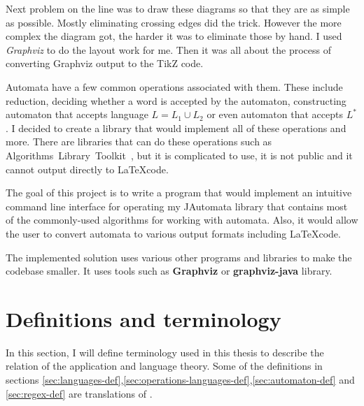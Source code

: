 \documentclass{ctuthesis}
\begin{document}
Next problem on the line was to draw these diagrams so that they are as simple as possible. Mostly eliminating crossing edges did the trick. However the more complex the diagram got, the harder it was to eliminate those by hand. I used \textit{Graphviz} to do the layout work for me. Then it was all about the process of converting Graphviz output to the TikZ code.

Automata have a few common operations associated with them. These include reduction, deciding whether a word is accepted by the automaton, constructing automaton that accepts language $L = L_1 \cup L_2$ or even automaton that accepts $L^*$. I decided to create a library that would implement all of these operations and more. There are libraries that can do these operations such as Algorithms~Library~Toolkit~\cite{alg_lib_toolkit}, but it is complicated to use, it is not public and it cannot output directly to \LaTeX code. 

The goal of this project is to write a program that would implement an intuitive command line interface for operating my JAutomata library that contains most of the commonly-used algorithms for working with automata. Also, it would allow the user to convert automata to various output formats including \LaTeX code.

The implemented solution uses various other programs and libraries to make the codebase smaller. It uses tools such as \textbf{Graphviz} or \textbf{graphviz-java} library. 

\chapter{Definitions and terminology}
In this section, I will define terminology used in this thesis to describe the relation of the application and language theory. Some of the definitions in sections \ref{sec:languages-def},\ref{sec:operations-languages-def},\ref{sec:automaton-def} and \ref{sec:regex-def} are translations of \cite{demlova}.
 
\end{document}
